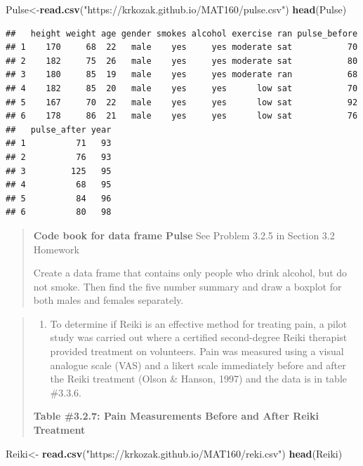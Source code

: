 \documentclass[]{book}
\newenvironment{Shaded}{\begin{snugshade}}{\end{snugshade}}
\newcommand{\KeywordTok}[1]{\textcolor[rgb]{0.13,0.29,0.53}{\textbf{#1}}}
\newcommand{\NormalTok}[1]{#1}
\newcommand{\StringTok}[1]{\textcolor[rgb]{0.31,0.60,0.02}{#1}}
\providecommand{\tightlist}{%
  \setlength{\itemsep}{0pt}\setlength{\parskip}{0pt}}
\begin{document}
\begin{Shaded}
\begin{Highlighting}[]
\NormalTok{Pulse<-}\KeywordTok{read.csv}\NormalTok{(}\StringTok{"https://krkozak.github.io/MAT160/pulse.csv"}\NormalTok{)}
\KeywordTok{head}\NormalTok{(Pulse)}
\end{Highlighting}
\end{Shaded}

\begin{verbatim}
##   height weight age gender smokes alcohol exercise ran pulse_before
## 1    170     68  22   male    yes     yes moderate sat           70
## 2    182     75  26   male    yes     yes moderate sat           80
## 3    180     85  19   male    yes     yes moderate ran           68
## 4    182     85  20   male    yes     yes      low sat           70
## 5    167     70  22   male    yes     yes      low sat           92
## 6    178     86  21   male    yes     yes      low sat           76
##   pulse_after year
## 1          71   93
## 2          76   93
## 3         125   95
## 4          68   95
## 5          84   96
## 6          80   98
\end{verbatim}

\begin{quote}
\textbf{Code book for data frame Pulse} See Problem 3.2.5 in Section 3.2 Homework

Create a data frame that contains only people who drink alcohol, but do not smoke. Then find the five number summary and draw a boxplot for both males and females separately.
\end{quote}

\begin{quote}
\begin{enumerate}
\def\labelenumi{\arabic{enumi}.}
\setcounter{enumi}{8}
\tightlist
\item
  To determine if Reiki is an effective method for treating pain, a pilot study was carried out where a certified second-degree Reiki therapist provided treatment on volunteers. Pain was measured using a visual analogue scale (VAS) and a likert scale immediately before and after the Reiki treatment (Olson \& Hanson, 1997) and the data is in table \#3.3.6.
\end{enumerate}

\textbf{Table \#3.2.7: Pain Measurements Before and After Reiki Treatment}
\end{quote}

\begin{Shaded}
\begin{Highlighting}[]
\NormalTok{Reiki<-}\StringTok{ }\KeywordTok{read.csv}\NormalTok{(}\StringTok{"https://krkozak.github.io/MAT160/reki.csv"}\NormalTok{)}
\KeywordTok{head}\NormalTok{(Reiki)}
\end{Highlighting}
\end{Shaded}
\end{document}
